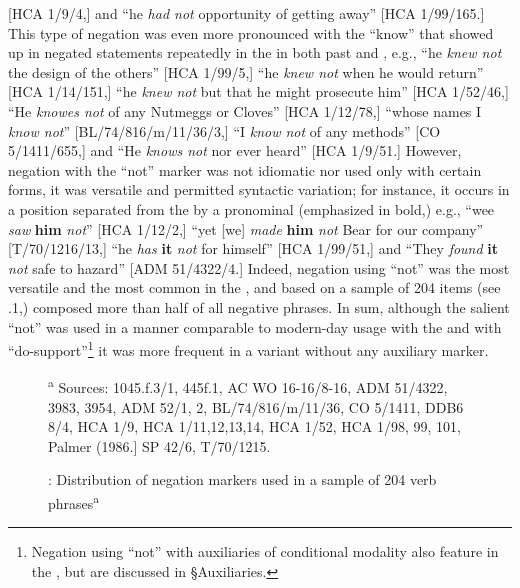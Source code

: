 [HCA 1/9/4,] and “he \textit{had not} opportunity of getting away” [HCA 1/99/165.] This type of negation was even more pronounced with the  “know” that showed up in negated statements repeatedly in the  in both past and , e.g., “he \textit{knew not} the design of the others” [HCA 1/99/5,] “he \textit{knew not} when he would return” [HCA 1/14/151,] “he \textit{knew not} but that he might prosecute him” [HCA 1/52/46,] “He \textit{knowes not} of any Nutmeggs or Cloves” [HCA 1/12/78,] “whose names I \textit{know not}” [BL/74/816/m/11/36/3,] “I \textit{know not} of any methods” [CO 5/1411/655,] and “He \textit{knows not} nor ever heard” [HCA 1/9/51.] However, negation with the “not” marker was not idiomatic nor used only with certain  forms, it was versatile and permitted syntactic variation; for instance, it occurs in a position separated from the  by a pronominal  (emphasized in bold,) e.g., “wee \textit{saw}\textbf{ }\textbf{him} \textit{not}” [HCA 1/12/2,] “yet [we] \textit{made} \textbf{him} \textit{not} Bear for our company” [T/70/1216/13,] “he \textit{has} \textbf{it} \textit{not} for himself” [HCA 1/99/51,] and “They \textit{found} \textbf{it} \textit{not} safe to hazard” [ADM 51/4322/4.] Indeed, negation using “not” was the most versatile and the most common  in the , and based on a sample of 204 items (see .1,) composed more than half of all negative  phrases. In sum, although the salient “not”  was used in a manner comparable to modern-day usage with the  and with “do-support”\footnote{Negation using “not” with auxiliaries of conditional modality also feature in the , but are discussed in §Auxiliaries.} it was more frequent in a variant  without any auxiliary marker.

  
\begin{figure}


\caption{\label{fig:key:6.1}: Distribution of negation markers used in a sample of 204 verb phrases\textsuperscript{a} }

\textsuperscript{a} Sources: 1045.f.3/1, 445f.1, AC WO 16-16/8-16, ADM 51/4322, 3983, 3954, ADM 52/1, 2, BL/74/816/m/11/36, CO 5/1411, DDB6 8/4, HCA 1/9, HCA 1/11,12,13,14, HCA 1/52, HCA 1/98, 99, 101, Palmer (1986.] SP 42/6, T/70/1215.
\end{figure}



